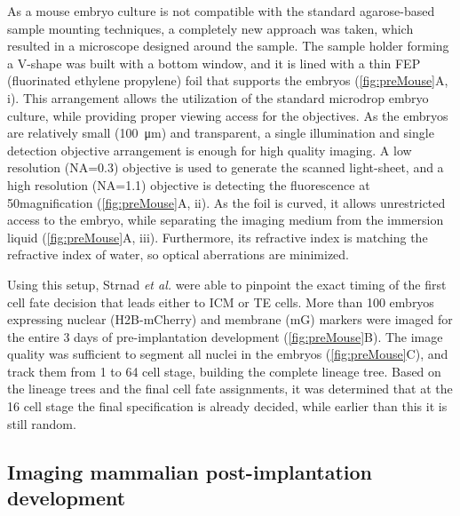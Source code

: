     
    As a mouse embryo culture is not compatible with the standard agarose-based sample mounting techniques, a completely new approach was taken, which resulted in a microscope designed around the sample. The sample holder forming a V-shape was built with a bottom window, and it is lined with a thin FEP (fluorinated ethylene propylene) foil that supports the embryos (\autoref{fig:preMouse}A, i). This arrangement allows the utilization of the standard microdrop embryo culture, while providing proper viewing access for the objectives. As the embryos are relatively small (\SI{100}{\micro m}) and transparent, a single illumination and single detection objective arrangement is enough for high quality imaging. A low resolution (NA=0.3) objective is used to generate the scanned light-sheet, and a high resolution (NA=1.1) objective is detecting the fluorescence at 50\texttimes magnification (\autoref{fig:preMouse}A, ii). As the foil is curved, it allows unrestricted access to the embryo, while separating the imaging medium from the immersion liquid (\autoref{fig:preMouse}A, iii). Furthermore, its refractive index is matching the refractive index of water, so optical aberrations are minimized.

    Using this setup, Strnad \textit{et al.} were able to pinpoint the exact timing of the first cell fate decision that leads either to ICM or TE cells. More than 100 embryos expressing nuclear (H2B-mCherry) and membrane (mG) markers were imaged for the entire 3 days of pre-implantation development (\autoref{fig:preMouse}B). The image quality was sufficient to segment all nuclei in the embryos (\autoref{fig:preMouse}C), and track them from 1 to 64 cell stage, building the complete lineage tree. Based on the lineage trees and the final cell fate assignments, it was determined that at the 16 cell stage the final specification is already decided, while earlier than this it is still random.
    




  \subsection{Imaging mammalian post-implantation development}
  
